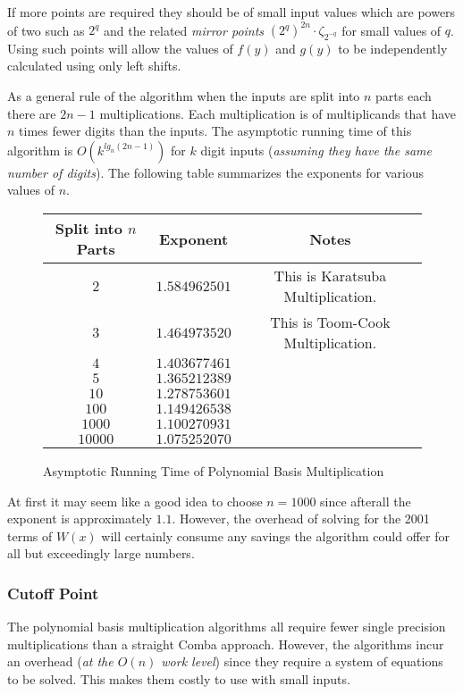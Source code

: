 \documentclass[b5paper]{book}
\begin{document}
If more points are required they should be of small input values which are powers of two such as 
$2^q$ and the related \textit{mirror points} $\left (2^q \right )^{2n}  \cdot \zeta_{2^{-q}}$ for small values of $q$.  Using such 
points will allow the values of $f(y)$ and $g(y)$ to be independently calculated using only left shifts.

As a general rule of the algorithm when the inputs are split into $n$ parts each there are $2n - 1$ multiplications.  Each multiplication is of 
multiplicands that have $n$ times fewer digits than the inputs.  The asymptotic running time of this algorithm is 
$O \left ( k^{lg_n(2n - 1)} \right )$ for $k$ digit inputs (\textit{assuming they have the same number of digits}).  The following table 
summarizes the exponents for various values of $n$.

\newpage\begin{figure}
\begin{center}
\begin{tabular}{|c|c|c|}
\hline \textbf{Split into $n$ Parts} & \textbf{Exponent}  & \textbf{Notes}\\
\hline $2$ & $1.584962501$ & This is Karatsuba Multiplication. \\
\hline $3$ & $1.464973520$ & This is Toom-Cook Multiplication. \\
\hline $4$ & $1.403677461$ &\\
\hline $5$ & $1.365212389$ &\\
\hline $10$ & $1.278753601$ &\\
\hline $100$ & $1.149426538$ &\\
\hline $1000$ & $1.100270931$ &\\
\hline $10000$ & $1.075252070$ &\\
\hline
\end{tabular}
\end{center}
\caption{Asymptotic Running Time of Polynomial Basis Multiplication}
\end{figure}

At first it may seem like a good idea to choose $n = 1000$ since afterall the exponent is approximately $1.1$.  However, the overhead
of solving for the 2001 terms of $W(x)$ will certainly consume any savings the algorithm could offer for all but exceedingly large
numbers.  

\subsubsection{Cutoff Point}
The polynomial basis multiplication algorithms all require fewer single precision multiplications than a straight Comba approach.  However, 
the algorithms incur an overhead (\textit{at the $O(n)$ work level}) since they require a system of equations to be solved.  This makes them costly to 
use with small inputs.  
\end{document}
